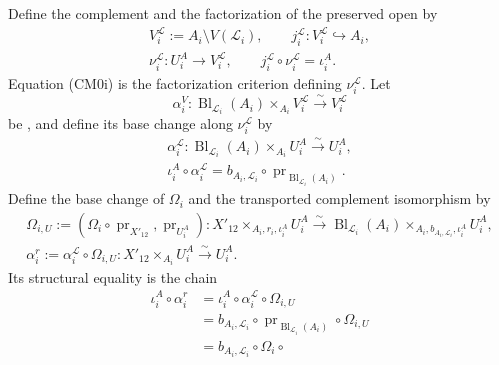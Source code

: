 \begin{definition}
\begin{enumerate}
      Define the complement and the factorization of the preserved open by
      \[
      \begin{gathered}
        V_i^{\mathcal L}:=A_i\setminus V(\mathcal L_i),\qquad
        j_i^{\mathcal L}\colon V_i^{\mathcal L}\hookrightarrow A_i,\\
        \nu_i^{\mathcal L}\colon U_i^A\longrightarrow V_i^{\mathcal L},
        \qquad
        j_i^{\mathcal L}\circ\nu_i^{\mathcal L}=\iota_i^A.
      \end{gathered}
      \]
      Equation (CM0i) is the factorization criterion defining
      \(\nu_i^{\mathcal L}\).  Let
      \[
        \alpha_i^V\colon
          \operatorname{Bl}_{\mathcal L_i}(A_i)
            \times_{A_i}V_i^{\mathcal L}
              \xrightarrow{\sim}V_i^{\mathcal L}
      \]
      be , and define its base change
      along \(\nu_i^{\mathcal L}\) by
      \[
      \begin{gathered}
        \alpha_i^{\mathcal L}\colon
          \operatorname{Bl}_{\mathcal L_i}(A_i)
            \times_{A_i}U_i^A\xrightarrow{\sim}U_i^A,\\
        \iota_i^A\circ\alpha_i^{\mathcal L}
          =b_{A_i,\mathcal L_i}\circ
            \operatorname{pr}_{\operatorname{Bl}_{\mathcal L_i}(A_i)}.
      \end{gathered}
      \]
      Define the base change of \(\Omega_i\) and the transported complement
      isomorphism by
      \[
      \begin{gathered}
        \Omega_{i,U}:=
          (\Omega_i\circ\operatorname{pr}_{X'_{12}},
            \operatorname{pr}_{U_i^A})
          \colon X'_{12}\times_{A_i,r_i,\iota_i^A}U_i^A
          \xrightarrow{\sim}
          \operatorname{Bl}_{\mathcal L_i}(A_i)
            \times_{A_i,b_{A_i,\mathcal L_i},\iota_i^A}U_i^A,\\
        \alpha_i^r:=\alpha_i^{\mathcal L}\circ\Omega_{i,U}
          \colon X'_{12}\times_{A_i}U_i^A\xrightarrow{\sim}U_i^A.
      \end{gathered}
      \]
      Its structural equality is the chain
      \[
      \begin{aligned}
        \iota_i^A\circ\alpha_i^r
          &=\iota_i^A\circ\alpha_i^{\mathcal L}\circ\Omega_{i,U}\\
          &=b_{A_i,\mathcal L_i}\circ
              \operatorname{pr}_{\operatorname{Bl}_{\mathcal L_i}(A_i)}
                \circ\Omega_{i,U}\\
          &=b_{A_i,\mathcal L_i}\circ\Omega_i\circ

\end{aligned}\]
\end{enumerate}
\end{definition}
